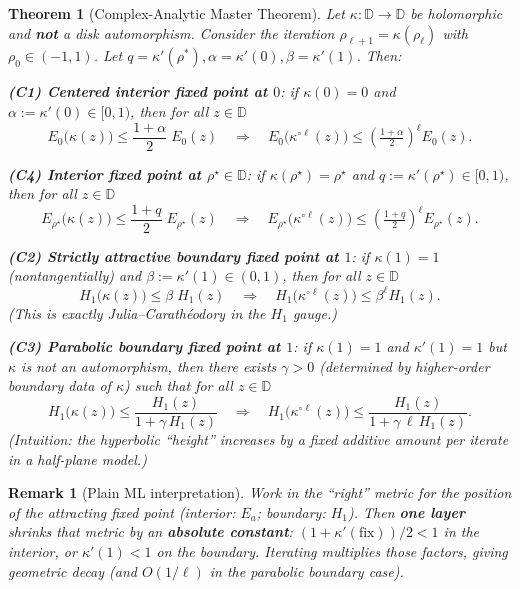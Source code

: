 \documentclass[11pt]{article}
\newtheorem{theorem}{Theorem}
\newtheorem{remark}{Remark}
\begin{document}
\begin{theorem}[Complex-Analytic Master Theorem]
Let $\kappa:\mathbb{D}\to\mathbb{D}$ be holomorphic and \textbf{not} a disk automorphism. Consider the iteration $\rho_{\ell+1}=\kappa(\rho_\ell)$ with $\rho_0\in(-1,1)$. Let $q = \kappa'(\rho^*), \alpha = \kappa'(0), \beta= \kappa'(1)$. Then:

\textbf{(C1) Centered interior fixed point at $0$}: if $\kappa(0)=0$ and $\alpha:=\kappa'(0)\in[0,1)$, then for all $z\in\mathbb{D}$
\begin{equation}
E_0\big(\kappa(z)\big) \leq \frac{1+\alpha}{2}\;E_0(z)
\quad\Longrightarrow\quad
E_0\big(\kappa^{\circ \ell}(z)\big) \leq \left(\tfrac{1+\alpha}{2}\right)^{\ell}E_0(z).
\end{equation}

\textbf{(C4) Interior fixed point at $\rho^\star\in\mathbb{D}$}: if $\kappa(\rho^\star)=\rho^\star$ and $q:=\kappa'(\rho^\star)\in[0,1)$, then for all $z\in\mathbb{D}$
\begin{equation}
E_{\rho^\star}\big(\kappa(z)\big) \leq \frac{1+q}{2}\;E_{\rho^\star}(z)
\quad\Longrightarrow\quad
E_{\rho^\star}\big(\kappa^{\circ \ell}(z)\big) \leq \left(\tfrac{1+q}{2}\right)^{\ell}E_{\rho^\star}(z).
\end{equation}

\textbf{(C2) Strictly attractive boundary fixed point at $1$}: if $\kappa(1)=1$ (nontangentially) and $\beta:=\kappa'(1)\in(0,1)$, then for all $z\in\mathbb{D}$
\begin{equation}
H_1\big(\kappa(z)\big) \leq \beta\;H_1(z)
\quad\Longrightarrow\quad
H_1\big(\kappa^{\circ \ell}(z)\big) \leq \beta^\ell H_1(z).
\end{equation}
(This is exactly Julia–Carathéodory in the $H_1$ gauge.)

\textbf{(C3) Parabolic boundary fixed point at $1$}: if $\kappa(1)=1$ and $\kappa'(1)=1$ but $\kappa$ is not an automorphism, then there exists $\gamma>0$ (determined by higher-order boundary data of $\kappa$) such that for all $z\in\mathbb{D}$
\begin{equation}
H_1\big(\kappa(z)\big) \leq \frac{H_1(z)}{1+\gamma\,H_1(z)}
\quad\Longrightarrow\quad
H_1\big(\kappa^{\circ \ell}(z)\big) \leq \frac{H_1(z)}{1+\gamma\,\ell\,H_1(z)}.
\end{equation}
(Intuition: the hyperbolic ``height'' increases by a fixed additive amount per iterate in a half-plane model.)
\end{theorem}

\begin{remark}[Plain ML interpretation]
Work in the ``right'' metric for the position of the attracting fixed point (interior: $E_a$; boundary: $H_1$). Then \textbf{one layer} shrinks that metric by an \textbf{absolute constant}: $(1+\kappa'(\text{fix}))/2<1$ in the interior, or $\kappa'(1)<1$ on the boundary. Iterating multiplies those factors, giving geometric decay (and $O(1/\ell)$ in the parabolic boundary case).
\end{remark}
\end{document}
